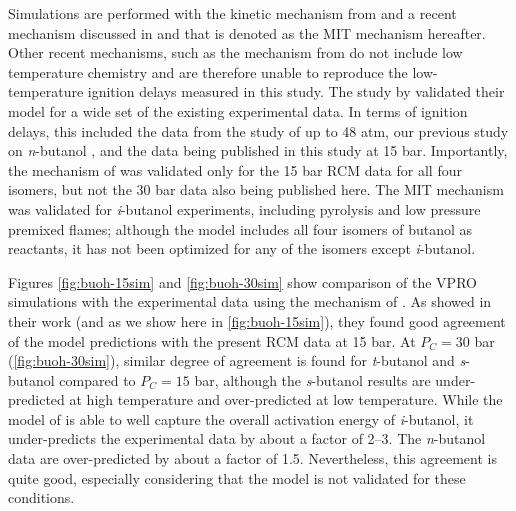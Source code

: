 \documentclass[12pt, letterpaper]{article}
\begin{document}
Simulations are performed with the kinetic mechanism from
\textcite{Sarathy2012} and a recent mechanism discussed in
\textcite{Hansen2013} and \textcite{Merchant2013} that is denoted as the MIT
mechanism hereafter. Other recent mechanisms, such as the mechanism from
\textcite{Frassoldati2012} do not include low temperature chemistry and are
therefore unable to reproduce the low-temperature ignition delays measured in
this study. The study by \textcite{Sarathy2012} validated their model for a
wide set of the existing experimental data. In terms of ignition delays, this
included the data from the study of \textcite{Stranic2012} up to 48 atm, our
previous study on \textit{n}-butanol \cite{Weber2011}, and the data being
published in this study at 15 bar. Importantly, the mechanism of
\textcite{Sarathy2012} was validated only for the 15 bar RCM data for all four
isomers, but not the 30 bar data also being published here. The MIT mechanism
\cite{Hansen2013,Merchant2013} was validated for \textit{i}-butanol
experiments, including pyrolysis and low pressure premixed flames; although the
model includes all four isomers of butanol as reactants, it has not been
optimized for any of the isomers except \textit{i}-butanol.

Figures \ref{fig:buoh-15sim} and \ref{fig:buoh-30sim} show comparison of the
VPRO simulations with the experimental data using the mechanism of
\textcite{Sarathy2012}. As \textcite{Sarathy2012} showed in their work (and as
we show here in \autoref{fig:buoh-15sim}), they found good agreement of the
model predictions with the present RCM data at 15 bar. At $P_C=30$ bar
(\autoref{fig:buoh-30sim}), similar degree of agreement is found for
\textit{t}-butanol and \textit{s}-butanol compared to $P_C=15$ bar, although
the \textit{s}-butanol results are under-predicted at high temperature and
over-predicted at low temperature. While the model of \textcite{Sarathy2012} is
able to well capture the overall activation energy of \textit{i}-butanol, it
under-predicts the experimental data by about a factor of 2–3. The
\textit{n}-butanol data are over-predicted by about a factor of 1.5.
Nevertheless, this agreement is quite good, especially considering that the
model is not validated for these conditions.
\end{document}
